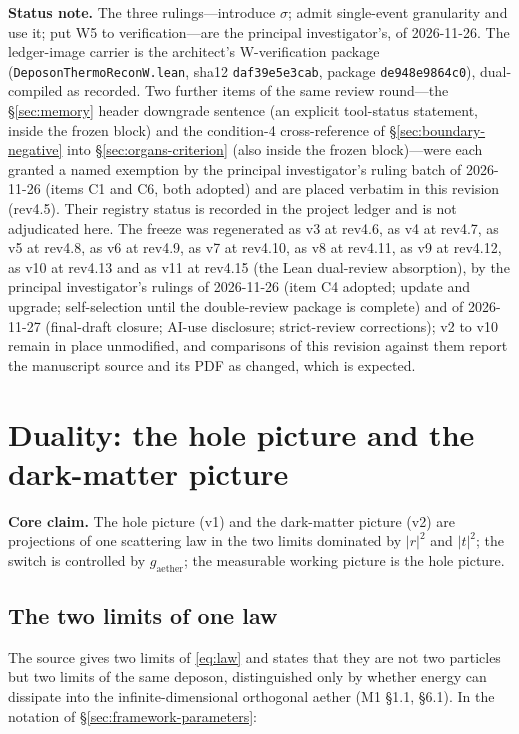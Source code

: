 \documentclass[11pt,a4paper]{article}
\newcommand{\gaether}{g_{\mathrm{aether}}}
\begin{document}
\textbf{Status note.} The three rulings---introduce $\sigma$; admit single-event granularity and use it; put W5 to verification---are the principal investigator's, of 2026-11-26. The ledger-image carrier is the architect's W-verification package (\texttt{DeposonThermoReconW.lean}, sha12 \texttt{daf39e5e3cab}, package \texttt{de948e9864c0}), dual-compiled as recorded. Two further items of the same review round---the \S\ref{sec:memory} header downgrade sentence (an explicit tool-status statement, inside the frozen block) and the condition-4 cross-reference of \S\ref{sec:boundary-negative} into \S\ref{sec:organs-criterion} (also inside the frozen block)---were each granted a named exemption by the principal investigator's ruling batch of 2026-11-26 (items C1 and C6, both adopted) and are placed verbatim in this revision (rev4.5). Their registry status is recorded in the project ledger and is not adjudicated here. The freeze was regenerated as v3 at rev4.6, as v4 at rev4.7, as v5 at rev4.8, as v6 at rev4.9, as v7 at rev4.10, as v8 at rev4.11, as v9 at rev4.12, as v10 at rev4.13 and as v11 at rev4.15 (the Lean dual-review absorption), by the principal investigator's rulings of 2026-11-26 (item C4 adopted; update and upgrade; self-selection until the double-review package is complete) and of 2026-11-27 (final-draft closure; AI-use disclosure; strict-review corrections); v2 to v10 remain in place unmodified, and comparisons of this revision against them report the manuscript source and its PDF as changed, which is expected.

\section{Duality: the hole picture and the dark-matter picture}
\label{sec:duality}

\textbf{Core claim.} The hole picture (v1) and the dark-matter picture (v2) are projections of one scattering law in the two limits dominated by $\lvert r\rvert^2$ and $\lvert t\rvert^2$; the switch is controlled by $\gaether$; the measurable working picture is the hole picture.

\subsection{The two limits of one law}
\label{sec:duality-limits}

The source gives two limits of \eqref{eq:law} and states that they are not two particles but two limits of the same deposon, distinguished only by whether energy can dissipate into the infinite-dimensional orthogonal aether (M1 §1.1, §6.1). In the notation of \S\ref{sec:framework-parameters}:
\end{document}
